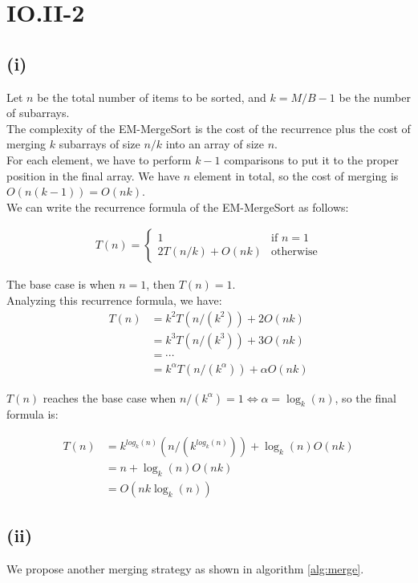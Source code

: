 \section*{IO.II-2}
\subsection*{(i)}
Let $n$ be the total number of items to be sorted, and $k = M/B - 1$ be the number of subarrays.\\

The complexity of the EM-MergeSort is the cost of the recurrence plus the cost of merging $k$ subarrays of size $n/k$ into an array of size $n$. \\ 

For each element, we have to perform $k-1$ comparisons to put it to the proper position in the final array. We have $n$ element in total, so the cost of merging is $O(n(k - 1)) = O(nk)$.\\

We can write the recurrence formula of the EM-MergeSort as follows:

\begin{align*}
	T(n) = \begin{cases}
	    1& \text{if } n = 1\\
        2T(n/k)+O(nk)              & \text{otherwise}
	\end{cases}
\end{align*}

The base case is when $n = 1$, then $T(n) = 1$.\\

Analyzing this recurrence formula, we have:
\begin{align*}
    T(n) &= k^2T(n/(k^2)) + 2O(nk)\\
    &= k^3T(n/(k^3)) + 3O(nk) \\
    &= \cdots \\
    &= k^\alpha T(n/(k^\alpha)) + \alpha O(nk)
\end{align*}

$T(n)$ reaches the base case when $n/(k^\alpha) = 1 \iff \alpha = \log_k(n)$, so the final formula is:

\begin{align*}
    T(n) &= k^{log_k(n)} (n/(k^{log_k(n)})) + \log_k(n)O(nk) \\
    &= n + \log_k(n)O(nk)\\
    &= O(nk\log_k(n))
\end{align*}

\subsection*{(ii)}
We propose another merging strategy as shown in algorithm \ref{alg:merge}.

